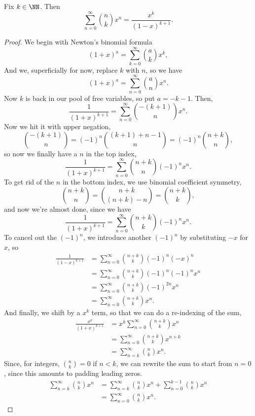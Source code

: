 \documentclass{article}
\begin{document}
\begin{theorem}
    Fix $k \in \NN$.
    Then
    \[
        \sum_{n=0}^\infty \binom{n}{k} x^n = \frac{x^k}{(1-x)^{k+1}}.
    \]
\end{theorem}
\begin{proof}
    We begin with Newton's binomial formula
    \[
        (1+x)^a = \sum_{k=0}^\infty \binom{a}{k} x^k,
    \]
    And we, superficially for now, replace $k$ with $n$, so we have
    \[
        (1+x)^a = \sum_{n=0}^\infty \binom{a}{n} x^n.
    \]
    Now $k$ is back in our pool of free variables, so put $a = -k-1$.
    Then,
    \[
        \frac{1}{(1+x)^{k+1}} = \sum_{n=0}^\infty \binom{-(k+1)}{n} x^n.
    \]
    Now we hit it with upper negation,
    \[
        \binom{-(k+1)}{n} = (-1)^n\binom{(k+1)+n-1}{n} = (-1)^n \binom{n+k}{n},
    \]
    so now we finally have a $n$ in the top index,
    \[
        \frac{1}{(1+x)^{k+1}} = \sum_{n=0}^\infty \binom{n+k}{n}(-1)^n x^n.
    \]
    To get rid of the $n$ in the bottom index, we use binomial coefficient symmetry,
    \[
        \binom{n+k}{n} = \binom{n+k}{(n+k)-n}= \binom{n+k}{k},
    \]
    and now we're almost done, since we have
    \[
        \frac{1}{(1+x)^{k+1}} = \sum_{n=0}^\infty \binom{n+k}{k}(-1)^n x^n.
    \]
    To cancel out the $(-1)^n$, we introduce another $(-1)^n$ by substituting $-x$ for $x$, so 
    \begin{align*}
        \frac{1}{(1-x)^{k+1}} &= \sum_{n=0}^\infty \binom{n+k}{k}(-1)^n (-x)^n \\
                              &= \sum_{n=0}^\infty \binom{n+k}{k}(-1)^n(-1)^n x^n \\
                              &= \sum_{n=0}^\infty \binom{n+k}{k}(-1)^{2n} x^n \\
                              &= \sum_{n=0}^\infty \binom{n+k}{k}x^n.
    \end{align*}
    And finally, we shift by a $x^k$ term, so that we can do a re-indexing of the sum,
    \begin{align*}
        \frac{x^k}{(1+x)^{k+1}} &= x^k\sum_{n=0}^\infty \binom{n+k}{k} x^n \\
                                &= \sum_{n=0}^\infty \binom{n+k}{k} x^{n+k} \\
                                &= \sum_{n=k}^\infty \binom{n}{k} x^{n}.
    \end{align*}
    Since, for integers, $\binom{n}{k} = 0$ if $n < k$, we can rewrite the sum to start from $n=0$, since this amounts to padding leading zeros.
    \begin{align*}
    \sum_{n=k}^\infty \binom{n}{k} x^{n} &= \sum_{n=k}^\infty \binom{n}{k} x^{n} + \sum_{n=0}^{k-1}\binom{n}{k}x^n \\
                                &= \sum_{n=0}^\infty \binom{n}{k} x^{n}.
    \end{align*}
\end{proof}
\end{document}
